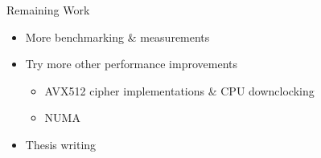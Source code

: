 \documentclass[NET,english]{tumbeamer}
\begin{document}
\begin{frame}{Remaining Work}
	\begin{itemize}
		\item More benchmarking \& measurements
		\item Try more other performance improvements
		\begin{itemize}
			\item AVX512 cipher implementations \& CPU downclocking
			\item NUMA
		\end{itemize}
		\item Thesis writing
	\end{itemize}
\end{frame}

%    
%    
\end{document}
